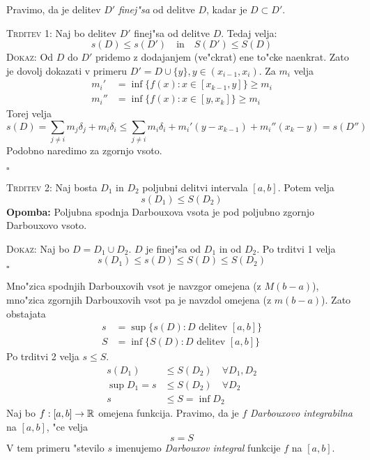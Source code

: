  Pravimo, da je delitev $D'$ \emph{finej"sa} od delitve $D$, kadar je $D \subset D'$.

\textsc{Trditev 1:} Naj bo delitev $D'$ finej"sa od delitve $D$. Tedaj velja:
\begin{equation*}
s(D) \leq s(D') \quad \text{in} \quad S(D') \leq S(D)
\end{equation*}
\textsc{Dokaz:} Od $D$ do $D'$ pridemo z dodajanjem (ve"ckrat) ene to"cke naenkrat. Zato je dovolj dokazati v primeru $D' = D \cup \{y\}, y \in (x_{i-1}, x_i)$. Za $m_i$ velja
\begin{align*}
m_i' &= \inf \{f(x): x \in [x_{k-1}, y]\} \geq m_i \\
m_i'' &= \inf \{f(x): x \in [y, x_k]\} \geq m_i
\end{align*}
Torej velja
\begin{equation*}
s(D) = \sum_{j \neq i} m_j \delta_j + m_i \delta_i \leq \sum_{j \neq i} m_i \delta_i + m_i' (y- x_{k-1}) + m_i'' (x_k - y) = s(D'')
\end{equation*}
Podobno naredimo za zgornjo vsoto.

\hfill $\square$

\textsc{Trditev 2:} Naj bosta $D_1$ in $D_2$ poljubni delitvi intervala $[a, b]$. Potem velja
\begin{equation*}
s(D_1) \leq S(D_2)
\end{equation*}
\textbf{Opomba:} Poljubna spodnja Darbouxova vsota je pod poljubno zgornjo Darbouxovo vsoto.

\textsc{Dokaz:} Naj bo $D = D_1 \cup D_2$. $D$ je finej"sa od $D_1$ in od $D_2$. Po trditvi 1 velja
\begin{equation*}
s(D_1) \leq s(D) \leq S(D) \leq S(D_2)
\end{equation*}
\hfill $\square$

Mno"zica spodnjih Darbouxovih vsot je navzgor omejena (z $M(b-a)$), mno"zica zgornjih Darbouxovih vsot pa je navzdol omejena (z $m(b-a)$). Zato obstajata
\begin{align*}
s &= \sup \{s(D): D \text{ delitev } [a, b]\} \\
S &= \inf \{S(D): D \text{ delitev } [a, b]\}
\end{align*}
Po trditvi 2 velja $s \leq S$.
\begin{align*}
s(D_1) &\leq S(D_2) \quad \forall D_1, D_2 \\
\sup D_1 = s &\leq S(D_2) \quad \forall D_2 \\
s &\leq S = \inf D_2
\end{align*}
%
 Naj bo $f: [a, b] \to \mathbb{R}$ omejena funkcija. Pravimo, da je $f$ \emph{Darbouxovo integrabilna} na $[a, b]$, "ce velja
\begin{equation*}
s = S
\end{equation*}
V tem primeru "stevilo $s$ imenujemo \emph{Darbouxov integral} funkcije $f$ na $[a, b]$.


